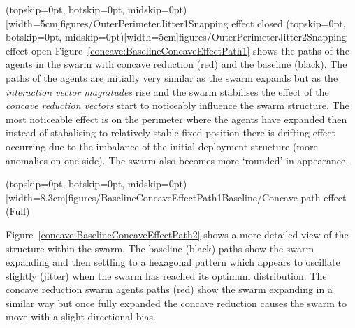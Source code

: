 \documentclass{ieeeaccess}
\begin{document}
\Figure[t!](topskip=0pt, botskip=0pt, midskip=0pt)[width=5cm]{figures/OuterPerimeterJitter1}{Snapping effect closed\label{fig:OuterPerimeterJitter1}}
\Figure[t!](topskip=0pt, botskip=0pt, midskip=0pt)[width=5cm]{figures/OuterPerimeterJitter2}{Snapping effect open\label{fig:OuterPerimeterJitter2}}
Figure~\ref{concave:BaselineConcaveEffectPath1} shows the paths of the agents in the swarm with concave reduction (red) and the baseline (black). The paths of the agents are initially very similar as the swarm expands but as the \textit{interaction vector magnitudes} rise and the swarm stabilises the effect of the \textit{concave reduction vectors} start to noticeably influence the swarm structure. The most noticeable effect is on the perimeter where the agents have expanded then instead of stabalising to relatively stable fixed position there is drifting effect occurring due to the imbalance of the initial deployment structure (more anomalies on one side). The swarm also becomes more `rounded' in appearance. 

\Figure[t!](topskip=0pt, botskip=0pt, midskip=0pt)[width=8.3cm]{figures/BaselineConcaveEffectPath1}{Baseline/Concave path effect (Full)\label{concave:BaselineConcaveEffectPath1}}

Figure~\ref{concave:BaselineConcaveEffectPath2} shows a more detailed view of the structure within the swarm. The baseline (black) paths show the swarm expanding and then settling to a hexagonal pattern which appears to oscillate slightly (jitter) when the swarm has reached its optimum distribution. The concave reduction swarm agents paths (red) show the swarm expanding in a similar way but once fully expanded the concave reduction causes the swarm to move with a slight directional bias.
\end{document}
